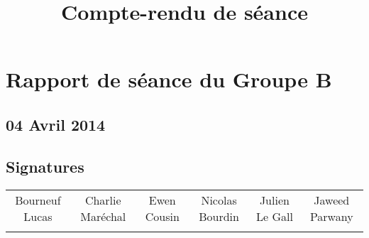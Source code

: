 
\title{Compte-rendu de séance}
\author{}
\date{} 

\pagestyle{empty} 
\pagestyle{fancy} 







\chapter*{Rapport de séance du Groupe B}	
\section*{04 Avril 2014}
	\vspace{12.1cm}


\section*{Signatures}

    	\begin{tabular*}{0.75\textwidth}{c | c | c | c | c | c}
    	    Bourneuf Lucas & Charlie Maréchal & Ewen Cousin & Nicolas Bourdin & Julien Le Gall & Jaweed Parwany\\
     	     & & & & &
    	\end{tabular*}




